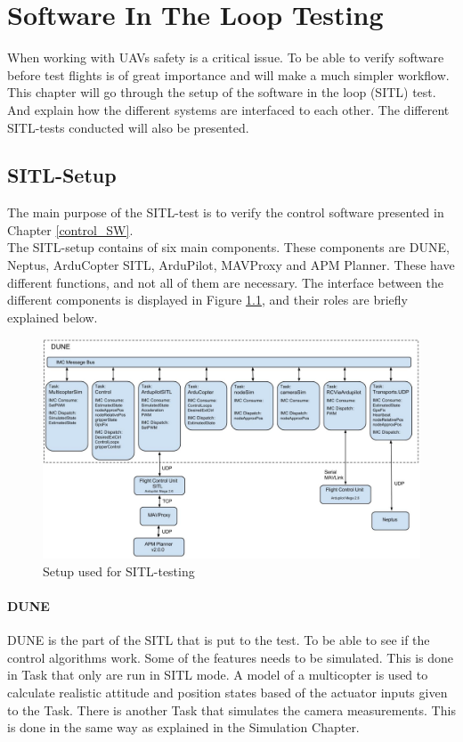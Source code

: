 \chapter{Software In The Loop Testing}
When working with UAVs safety is a critical issue. To be able to verify software before test flights is of great importance and will make a much simpler workflow. This chapter will go through the setup of the software in the loop (SITL) test. And explain how the different systems are interfaced to each other. The different SITL-tests conducted will also be presented.
\section{SITL-Setup}
The main purpose of the SITL-test is to verify the control software presented in Chapter \ref{control_SW}.\\
\newline
The SITL-setup contains of six main components. These components are DUNE, Neptus, ArduCopter SITL, ArduPilot, MAVProxy and APM Planner. These have different functions, and not all of them are necessary. The interface between the different components is displayed in Figure \ref{sitl}, and their roles are briefly explained below.
\begin{figure}[H]
\centering
\includegraphics[width = 17cm]{fig/Simulation.jpg}
\caption{Setup used for SITL-testing}
\label{sitl}
\end{figure}
\subsubsection*{DUNE}
DUNE is the part of the SITL that is put to the test. To be able to see if the control algorithms work. Some of the features needs to be simulated. This is done in Task that only are run in SITL mode. A model of a multicopter is used to calculate realistic attitude and position states based of the actuator inputs given to the Task. There is another Task that simulates the camera measurements. This is done in the same way as explained in the Simulation Chapter.
